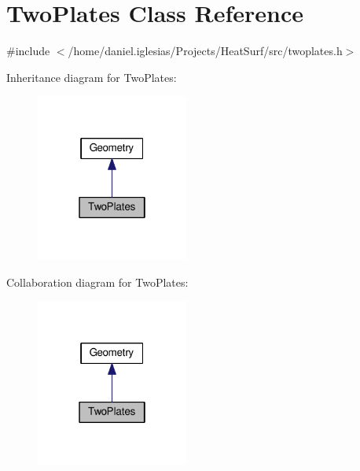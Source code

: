 \hypertarget{classTwoPlates}{\section{Two\-Plates Class Reference}
\label{classTwoPlates}
}


{\ttfamily \#include $<$/home/daniel.\-iglesias/\-Projects/\-Heat\-Surf/src/twoplates.\-h$>$}



Inheritance diagram for Two\-Plates\-:\nopagebreak
\begin{figure}[H]
\begin{center}
\leavevmode
\includegraphics[width=142pt]{classTwoPlates__inherit__graph}
\end{center}
\end{figure}


Collaboration diagram for Two\-Plates\-:\nopagebreak
\begin{figure}[H]
\begin{center}
\leavevmode
\includegraphics[width=142pt]{classTwoPlates__coll__graph}
\end{center}
\end{figure}

